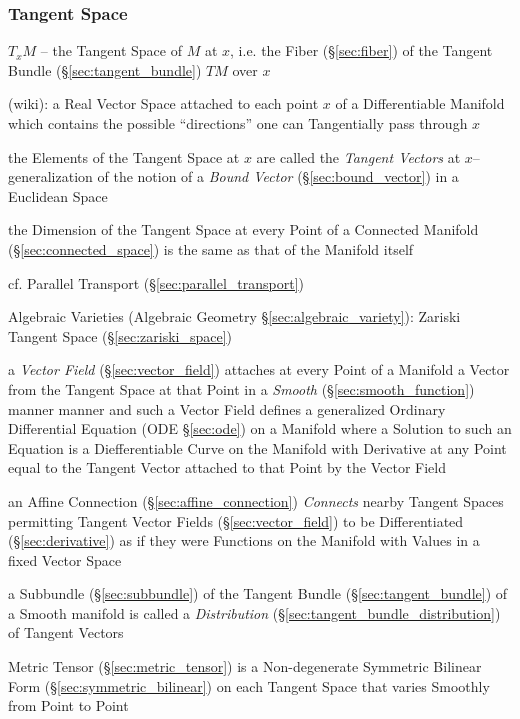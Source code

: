 \subsubsection{Tangent Space}\label{sec:tangent_space}

$T_x M$ -- the Tangent Space of $M$ at $x$, i.e. the Fiber (\S\ref{sec:fiber})
of the Tangent Bundle (\S\ref{sec:tangent_bundle}) $T M$ over $x$

(wiki): a Real Vector Space attached to each point $x$ of a Differentiable
Manifold which contains the possible ``directions'' one can Tangentially pass
through $x$

the Elements of the Tangent Space at $x$ are called the \emph{Tangent Vectors}
at $x$-- generalization of the notion of a \emph{Bound Vector}
(\S\ref{sec:bound_vector}) in a Euclidean Space

the Dimension of the Tangent Space at every Point of a Connected Manifold
(\S\ref{sec:connected_space}) is the same as that of the Manifold itself

\fist cf. Parallel Transport (\S\ref{sec:parallel_transport})

\fist Algebraic Varieties (Algebraic Geometry \S\ref{sec:algebraic_variety}):
Zariski Tangent Space (\S\ref{sec:zariski_space})

a \emph{Vector Field} (\S\ref{sec:vector_field}) attaches at every Point of a
Manifold a Vector from the Tangent Space at that Point in a \emph{Smooth}
(\S\ref{sec:smooth_function}) manner manner and such a Vector Field defines a
generalized Ordinary Differential Equation (ODE \S\ref{sec:ode}) on a Manifold
where a Solution to such an Equation is a Diefferentiable Curve on the Manifold
with Derivative at any Point equal to the Tangent Vector attached to that Point
by the Vector Field

\fist an Affine Connection (\S\ref{sec:affine_connection}) \emph{Connects}
nearby Tangent Spaces permitting Tangent Vector Fields
(\S\ref{sec:vector_field}) to be Differentiated (\S\ref{sec:derivative}) as if
they were Functions on the Manifold with Values in a fixed Vector Space

a Subbundle (\S\ref{sec:subbundle}) of the Tangent Bundle
(\S\ref{sec:tangent_bundle}) of a Smooth manifold is called a
\emph{Distribution} (\S\ref{sec:tangent_bundle_distribution}) of Tangent
Vectors

Metric Tensor (\S\ref{sec:metric_tensor}) is a Non-degenerate Symmetric Bilinear
Form (\S\ref{sec:symmetric_bilinear}) on each Tangent Space that varies Smoothly
from Point to Point



